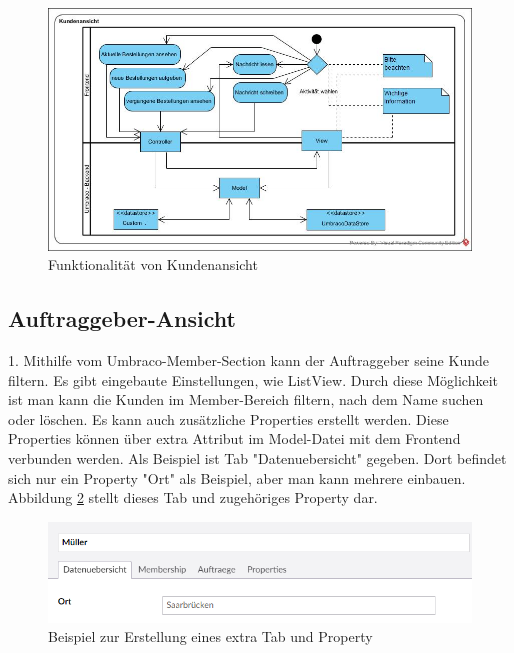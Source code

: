 \begin{figure}[h]
	\centering
	\includegraphics[width=1\linewidth]{Graphics/KundenansichtNeu.jpg}
	\caption[Funktionalität von Kundenansicht]{Funktionalität von Kundenansicht}
	\label{fig:KundenansichtNeu}
\end{figure}

\subsection{Auftraggeber-Ansicht}
  
1. Mithilfe vom Umbraco-Member-Section kann der Auftraggeber seine Kunde filtern. Es gibt eingebaute Einstellungen, wie ListView. Durch diese Möglichkeit ist man kann die Kunden im Member-Bereich filtern, nach dem Name suchen oder löschen. Es kann auch zusätzliche Properties erstellt werden. Diese Properties können über extra Attribut im Model-Datei mit dem Frontend verbunden werden.
Als Beispiel ist Tab "Datenuebersicht" gegeben. Dort befindet sich nur ein Property "Ort" als Beispiel, aber man kann mehrere einbauen. Abbildung \ref{fig:auftraggeberAnsichtDaten} stellt dieses Tab und zugehöriges Property dar.
\begin{figure}[h]
	\centering
	\includegraphics[width=1\linewidth]{Graphics/auftraggeberAnsichtDaten.png}
	\caption[Kundeansicht]{Beispiel zur Erstellung eines extra Tab und Property}
	\label{fig:auftraggeberAnsichtDaten}
\end{figure}

